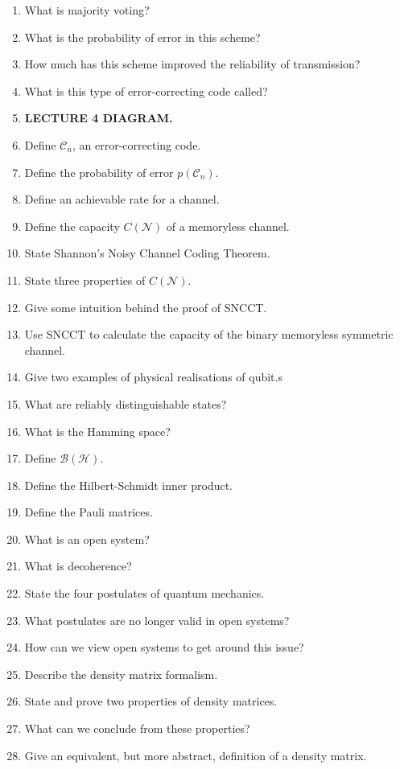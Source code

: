 \documentclass{article}
\newcommand{\mc}[1]{\mathcal{#1}}
\begin{document}
\begin{enumerate}
    \item What is majority voting?
    \item What is the probability of error in this scheme?
    \item How much has this scheme improved the reliability of transmission?
    \item What is this type of error-correcting code called?
    \item \textbf{LECTURE 4 DIAGRAM.}
    \item Define $\mc{C}_n$, an error-correcting code.
    \item Define the probability of error $p(\mc{C}_n)$.
    \item Define an achievable rate for a channel.
    \item Define the capacity $C(\mc{N})$ of a memoryless channel.
    \item State Shannon's Noisy Channel Coding Theorem.
    \item State three properties of $C(\mc{N})$.
    \item Give some intuition behind the proof of SNCCT.
    \item Use SNCCT to calculate the capacity of the binary memoryless symmetric channel.
    \item Give two examples of physical realisations of qubit.s
    \item What are reliably distinguishable states?
    \item What is the Hamming space?
    \item Define $\mc{B}(\mc{H})$.
    \item Define the Hilbert-Schmidt inner product.
    \item Define the Pauli matrices.
    \item What is an open system?
    \item What is decoherence?
    \item State the four postulates of quantum mechanics.
    \item What postulates are no longer valid in open systems?
    \item How can we view open systems to get around this issue?
    \item Describe the density matrix formalism.
    \item State and prove two properties of density matrices.
    \item What can we conclude from these properties?
    \item Give an equivalent, but more abstract, definition of a density matrix.

\end{enumerate}
\end{document}

